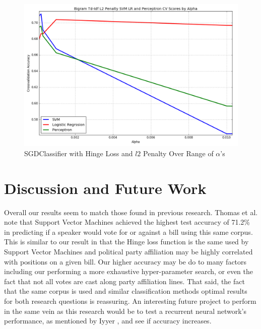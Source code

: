\documentclass[a4paper, 12pt]{article}
\begin{document}
\begin{figure}[!ht]
\centering
\includegraphics[width=0.5\linewidth]{ZoomedL2NormSVM.png}
\caption[SGDClassifier with Hinge Loss and $l2$ Penalty Over a Range of $\alpha$ ]{SGDClassifier with Hinge Loss and $l2$ Penalty Over Range of $\alpha$'s}
\label{fig: sgd}
\end{figure}

\section{Discussion and Future Work}
Overall our results seem to match those found in previous research. Thomas et al. note \cite{thomas2006get} that Support Vector Machines achieved the highest test accuracy of 71.2\% in predicting if a speaker would vote for or against a bill using this same corpus. This is similar to our result in that the Hinge loss function is the same used by Support Vector Machines and political party affiliation may be highly correlated with positions on a given bill.  Our higher accuracy may be do to many factors including our performing a more exhaustive hyper-parameter search, or even the fact that not all votes are cast along party affiliation lines. That said, the fact that the same corpus is used and similar classification methods optimal results for both research questions is reassuring. An interesting future project to perform in the same vein as this research would be to test a recurrent neural network's performance, as mentioned by Iyyer \cite{iyyer2014political}, and see if accuracy increases. 
\newpage


\end{document}
